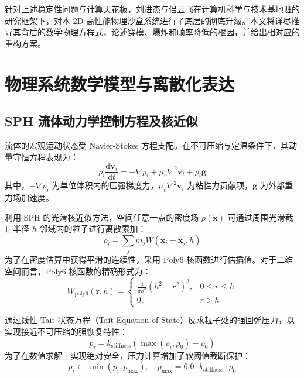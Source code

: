 \documentclass[11pt,a4paper]{article}
\begin{document}
针对上述稳定性问题与计算天花板，刘进杰与侣云飞在计算机科学与技术基地班的研究框架下，对本 2D 高性能物理沙盒系统进行了底层的彻底升级。本文将详尽推导其背后的数学物理方程式，论述穿模、爆炸和帧率降低的根因，并给出相对应的重构方案。

\section{物理系统数学模型与离散化表达}

\subsection{SPH 流体动力学控制方程及核近似}
流体的宏观运动状态受 Navier-Stokes 方程支配。在不可压缩与定温条件下，其动量守恒方程表现为：
\begin{equation}
\rho_i \frac{\text{d}\mathbf{v}_i}{\text{d}t} = -\nabla p_i + \mu_v \nabla^2 \mathbf{v}_i + \rho_i \mathbf{g}
\end{equation}
其中，$-\nabla p_i$ 为单位体积内的压强梯度力，$\mu_v \nabla^2 \mathbf{v}_i$ 为粘性力贡献项，$\mathbf{g}$ 为外部重力场加速度。

利用 SPH 的光滑核近似方法，空间任意一点的密度场 $\rho(\mathbf{x})$ 可通过周围光滑截止半径 $h$ 邻域内的粒子进行离散累加：
\begin{equation}
\rho_i = \sum_{j} m_j W(\mathbf{x}_i - \mathbf{x}_j, h)
\end{equation}
为了在密度估算中获得平滑的连续性，采用 $\text{Poly6}$ 核函数进行估插值。对于二维空间而言，$\text{Poly6}$ 核函数的精确形式为：
\begin{equation}
W_{\text{poly6}}(\mathbf{r}, h) = 
\begin{cases} 
\frac{4}{\pi h^8} (h^2 - r^2)^3, & 0 \le r \le h \\
0, & r > h
\end{cases}
\end{equation}

通过线性 Tait 状态方程（Tait Equation of State）反求粒子处的强回弹压力，以实现接近不可压缩的强恢复特性：
\begin{equation}
p_i = k_{\text{stiffness}} \left( \max(\rho_i, \rho_0) - \rho_0 \right)
\end{equation}
为了在数值求解上实现绝对安全，压力计算增加了软阈值截断保护：
\begin{equation}
p_i \leftarrow \min(p_i, p_{\text{max}}), \quad p_{\text{max}} = 6.0 \cdot k_{\text{stiffness}} \cdot \rho_0
\end{equation}
\end{document}
